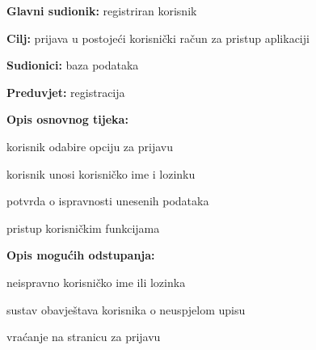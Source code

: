 					\noindent {}
					\begin{packed_item}
						
						\item \textbf{Glavni sudionik: } registriran korisnik
						\item  \textbf{Cilj:} prijava u postojeći korisnički račun za pristup aplikaciji
						\item  \textbf{Sudionici:} baza podataka
						\item  \textbf{Preduvjet:} registracija
						\item  \textbf{Opis osnovnog tijeka:}
						
						\item[] \begin{packed_enum}
							
							\item korisnik odabire opciju za prijavu
							\item korisnik unosi korisničko ime i lozinku
							\item potvrda o ispravnosti unesenih podataka
							\item pristup korisničkim funkcijama
						\end{packed_enum}
						
						\item  \textbf{Opis mogućih odstupanja:}
						
						\item[] \begin{packed_item}
							
							\item[3.a] neispravno korisničko ime ili lozinka
							\item[] \begin{packed_enum}
								\item sustav obavještava korisnika o neuspjelom upisu
								\item vraćanje na stranicu za prijavu
							\end{packed_enum}
							
						\end{packed_item}
					\end{packed_item}
					
